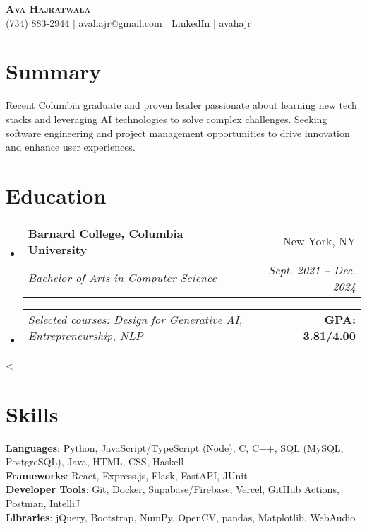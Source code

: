 \documentclass[letterpaper,11pt]{article}
\makeatletter
\newcommand{\resumeSubheading}[4]{
    \vspace{-2pt}\item
    \begin{tabular*}{0.97\textwidth}[t]{l@{\extracolsep{\fill}}r}
    \textbf{#1} & #2 \\
    \textit{\small#3} & \textit{\small #4} \\
    \end{tabular*}\vspace{-7pt}
}
\newcommand{\relevantCourseWorkAndGPA}[2]{
    \item
    \begin{tabular*}{0.97\textwidth}{l@{\extracolsep{\fill}}r}
    \textit{Selected courses: \small#1} & \textbf{\small GPA: #2/4.00} \\
    \end{tabular*}\vspace{-7pt}
}
\newcommand{\conditionalVspace}[1]{%
\ifnum\value{enumi}<\value{enumii}%
\vspace{#1}%
\fi
}
\newcommand{\resumeSubHeadingListStart}{\begin{itemize}[leftmargin=0.15in, label={}] \setlength{\itemsep}{7pt}}
\newcommand{\resumeSubHeadingListEnd}{\end{itemize}\conditionalVspace{7pt}}
\makeatother
\begin{document}

\begin{center}
\textbf{\Huge \scshape Ava Hajratwala} \\ \vspace{1pt}
\small (734) 883-2944 $|$ \href{mailto:avahajr@gmail.com}{{avahajr@gmail.com}} $|$
\href{https://linkedin.com/in/avahajr}{\color{blue} \underline{LinkedIn}} $|$
{\faGithub} \href{https://github.com/avahajr}{\color{blue}\underline{avahajr}}
\end{center}

\section{Summary}
\small Recent Columbia graduate and proven leader passionate about learning new tech stacks and leveraging AI technologies to solve complex challenges. Seeking software engineering and project management opportunities to drive innovation and enhance user experiences.
\section{Education}
\resumeSubHeadingListStart
\resumeSubheading
{Barnard College, Columbia University}{New York, NY}
{Bachelor of Arts in Computer Science}{Sept. 2021 -- Dec. 2024}
\relevantCourseWorkAndGPA{Design for Generative AI, Entrepreneurship, NLP}{3.81}
\resumeSubHeadingListEnd

\section{Skills}
\begin{itemize}[leftmargin=0.15in, label={}]
\small{\item{
\textbf{Languages}{: Python, JavaScript/TypeScript (Node), C, C++, SQL (MySQL, PostgreSQL), Java, HTML, CSS, Haskell} \\
\textbf{Frameworks}{: React, Express.js, Flask, FastAPI, JUnit } \\
\textbf{Developer Tools}{: Git, Docker, Supabase/Firebase, Vercel, GitHub Actions, Postman, IntelliJ} \\
\textbf{Libraries}{: jQuery, Bootstrap, NumPy, OpenCV, pandas, Matplotlib, WebAudio}
}}
\end{itemize}
\end{document}
